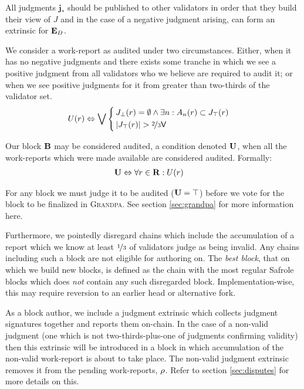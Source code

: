 All judgments $\mathbf{j}_*$ should be published to other validators in order that they build their view of $J$ and in the case of a negative judgment arising, can form an extrinsic for $\mathbf{E}_D$.

We consider a work-report as audited under two circumstances. Either, when it has no negative judgments and there exists some tranche in which we see a positive judgment from all validators who we believe are required to audit it; or when we see positive judgments for it from greater than two-thirds of the validator set.
\begin{align}
  U(\wrX) &\Leftrightarrow \bigvee\,\abracegroup[\,]{
    &J_\bot(\wrX) = \emptyset \wedge \exists n : A\sub{n}(\wrX) \subset J_\top(\wrX) \\
    &\len{J_\top(\wrX)} > \twothirds\valcount
  }
\end{align}

Our block $\mathbf{B}$ may be considered audited, a condition denoted $\mathbf{U}$, when all the work-reports which were made available are considered audited. Formally:
\begin{align}
  \mathbf{U} &\Leftrightarrow \forall r \in \mathbf{R} : U(r)
\end{align}

For any block we must judge it to be audited (\ie $\mathbf{U} = \top$) before we vote for the block to be finalized in \textsc{Grandpa}. See section \ref{sec:grandpa} for more information here.

Furthermore, we pointedly disregard chains which include the accumulation of a report which we know at least $\nicefrac{1}{3}$ of validators judge as being invalid. Any chains including such a block are not eligible for authoring on. The \emph{best block}, \ie that on which we build new blocks, is defined as the chain with the most regular Safrole blocks which does \emph{not} contain any such disregarded block. Implementation-wise, this may require reversion to an earlier head or alternative fork.

As a block author, we include a judgment extrinsic which collects judgment signatures together and reports them on-chain. In the case of a non-valid judgment (\ie one which is not two-thirds-plus-one of judgments confirming validity) then this extrinsic will be introduced in a block in which accumulation of the non-valid work-report is about to take place. The non-valid judgment extrinsic removes it from the pending work-reports, $\rho$. Refer to section \ref{sec:disputes} for more details on this.

